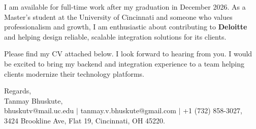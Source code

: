 \documentclass[11pt]{letter}
\begin{document}
\begin{letter}{}
I am available for full-time work after my graduation in December 2026. As a Master's student at the University of Cincinnati and someone who values professionalism and growth, I am enthusiastic about contributing to \textbf{Deloitte} and helping design reliable, scalable integration solutions for its clients.

Please find my CV attached below. I look forward to hearing from you. I would be excited to bring my backend and integration experience to a team helping clients modernize their technology platforms.

{\setlength{\parskip}{0pt}
Regards,\\
Tanmay Bhuskute,\\
bhuskutv@mail.uc.edu $\mid$ tanmay.v.bhuskute@gmail.com $\mid$ +1 (732) 858-3027,\\
3424 Brookline Ave, Flat 19, Cincinnati, OH 45220.
}

\end{letter}
\end{document}
